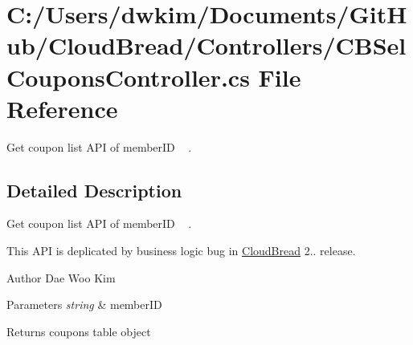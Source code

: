 \hypertarget{a00142}{}\section{C\+:/\+Users/dwkim/\+Documents/\+Git\+Hub/\+Cloud\+Bread/\+Controllers/\+C\+B\+Sel\+Coupons\+Controller.cs File Reference}
\label{a00142}


Get coupon list A\+PI of member\+ID ~\newline
.  




\subsection{Detailed Description}
Get coupon list A\+PI of member\+ID ~\newline
. 

This A\+PI is deplicated by business logic bug in \hyperlink{a00217}{Cloud\+Bread} 2.. release.

\begin{DoxyAuthor}{Author}
Dae Woo Kim 
\end{DoxyAuthor}

\begin{DoxyParams}{Parameters}
{\em string} & member\+ID \\
\hline
\end{DoxyParams}
\begin{DoxyReturn}{Returns}
coupons table object 
\end{DoxyReturn}
